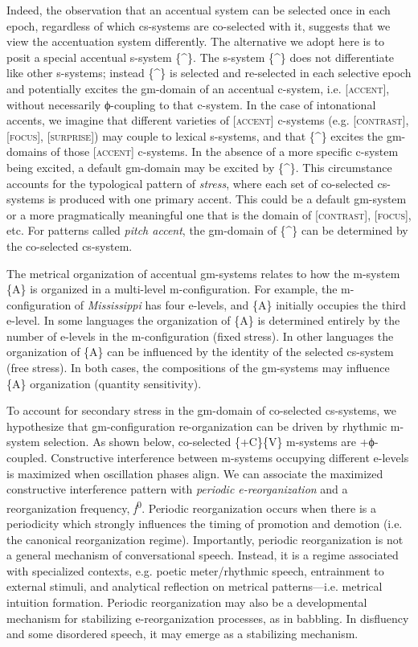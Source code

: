   Indeed, the observation that an accentual system can be selected once in each epoch, regardless of which cs-systems are co-selected with it, suggests that we view the accentuation system differently. The alternative we adopt here is to posit a special accentual s-system \{\^{}\}. The s-system \{\^{}\} does not differentiate like other s-systems; instead \{\^{}\} is selected and re-selected in each selective epoch and potentially excites the gm-domain of an accentual c-system, i.e. [\textsc{accent}], without necessarily ϕ-coupling to that c-system. In the case of intonational accents, we imagine that different varieties of [\textsc{accent}] c-systems (e.g. [\textsc{contrast}], [\textsc{focus}], [\textsc{surprise}]) may couple to lexical s-systems, and that \{\^{}\} excites the gm-domains of those [\textsc{accent}] c-systems. In the absence of a more specific c-system being excited, a default gm-domain may be excited by \{\^{}\}. This circumstance accounts for the typological pattern of \textit{stress}, where each set of co-selected cs-systems is produced with one primary accent. This could be a default gm-system or a more pragmatically meaningful one that is the domain of [\textsc{contrast}], [\textsc{focus}], etc. For patterns called \textit{pitch accent}, the gm-domain of \{\^{}\} can be determined by the co-selected cs-system.

  The metrical organization of accentual gm-systems relates to how the m-system \{A\} is organized in a multi-level m-configuration. For example, the m-configuration of \textit{Mississippi} has four e-levels, and \{A\} initially occupies the third e-level. In some languages the organization of \{A\} is determined entirely by the number of e-levels in the m-configuration (fixed stress). In other languages the organization of \{A\} can be influenced by the identity of the selected cs-system (free stress). In both cases, the compositions of the gm-systems may influence \{A\} organization (quantity sensitivity). 

  To account for secondary stress in the gm-domain of co-selected cs-systems, we hypothesize that gm-configuration re-organization can be driven by rhythmic m-system selection. As shown below, co-selected \{+C\}\{V\} m-systems are +ϕ-coupled. Constructive interference between m-systems occupying different e-levels is maximized when oscillation phases align. We can associate the maximized constructive interference pattern with \textit{periodic e-reorganization} and a reorganization frequency, \textit{f}\textsuperscript{0}. Periodic reorganization occurs when there is a periodicity which strongly influences the timing of promotion and demotion (i.e. the canonical reorganization regime). Importantly, periodic reorganization is not a general mechanism of conversational speech. Instead, it is a regime associated with specialized contexts, e.g. poetic meter/rhythmic speech, entrainment to external stimuli, and analytical reflection on metrical patterns—i.e. metrical intuition formation. Periodic reorganization may also be a developmental mechanism for stabilizing e-reorganization processes, as in babbling. In disfluency and some disordered speech, it may emerge as a stabilizing mechanism.

